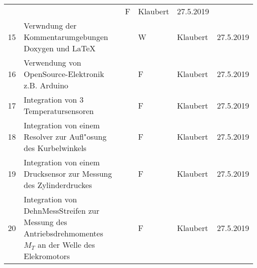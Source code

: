 \begin{center}
\begin{tabular}{|l|p{5cm}|p{3cm}|l|l|l|}
     & & F & Klaubert & 27.5.2019 \\
 15 & Verwndung der Kommentarumgebungen Doxygen und LaTeX
      & & W & Klaubert & 27.5.2019 \\
 16 & Verwendung von OpenSource-Elektronik z.B. Arduino
    & & F & Klaubert & 27.5.2019 \\
 17 & Integration von 3 Temperatursensoren
    & & F & Klaubert & 27.5.2019 \\
 18 & Integration von einem Resolver zur Aufl"osung des Kurbelwinkels
    & & F & Klaubert & 27.5.2019 \\
 19 & Integration von einem Drucksensor zur Messung des Zylinderdruckes
    & & F & Klaubert & 27.5.2019 \\
 20 & Integration von DehnMessStreifen zur Messung des Antriebsdrehmomentes
     $M_T$ an der Welle des Elekromotors
    & & F & Klaubert & 27.5.2019 \\
   \hline
   \end{tabular}



\end{center}
